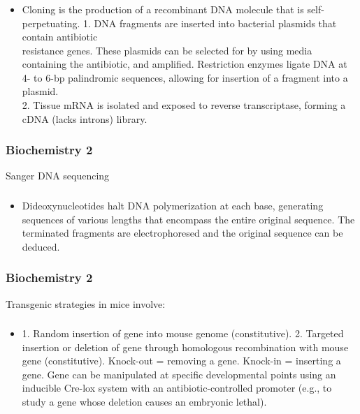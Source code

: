 \documentclass[11pt]{beamer}
\begin{document}
\begin{frame}
 \frametitle{}
\begin{itemize}
\item Cloning is the production of a recombinant DNA molecule that is self-perpetuating. 1. DNA fragments are inserted into bacterial plasmids that contain antibiotic \\ resistance genes. These plasmids can be selected for by using media containing the antibiotic, and amplified. Restriction enzymes ligate DNA at 4- to 6-bp palindromic sequences, allowing for insertion of a fragment into a plasmid. \\ 2. Tissue mRNA is isolated and exposed to reverse transcriptase, forming a \\ cDNA (lacks introns) library.
\end{itemize}
\end{frame}

\begin{frame}
 \frametitle{Biochemistry 2}
Sanger DNA sequencing
\end{frame}

\begin{frame}
 \frametitle{}
\begin{itemize}
\item Dideoxynucleotides halt DNA polymerization at each base, generating sequences of various lengths that encompass the entire original sequence. The terminated fragments are electrophoresed and the original sequence can be deduced.
\end{itemize}
\end{frame}

\begin{frame}
 \frametitle{Biochemistry 2}
Transgenic strategies in mice involve:
\end{frame}

\begin{frame}
 \frametitle{}
\begin{itemize}
\item 1. Random insertion of gene into mouse genome (constitutive). 2. Targeted insertion or deletion of gene through homologous recombination with
mouse gene (constitutive). Knock-out = removing a gene. Knock-in = inserting a gene. Gene can be manipulated at specific developmental points using an inducible Cre-lox system with an antibiotic-controlled promoter (e.g., to study a gene whose deletion causes an embryonic lethal).
\end{itemize}
\end{frame}
\end{document}
